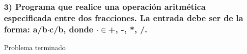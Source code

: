 \subsubsection*{3) Programa que realice una operación aritmética especificada entre dos fracciones. La entrada debe ser de la forma: a/b$\cdot$c/b, donde  $\cdot \in${+, -, *, /}.}

Problema terminado